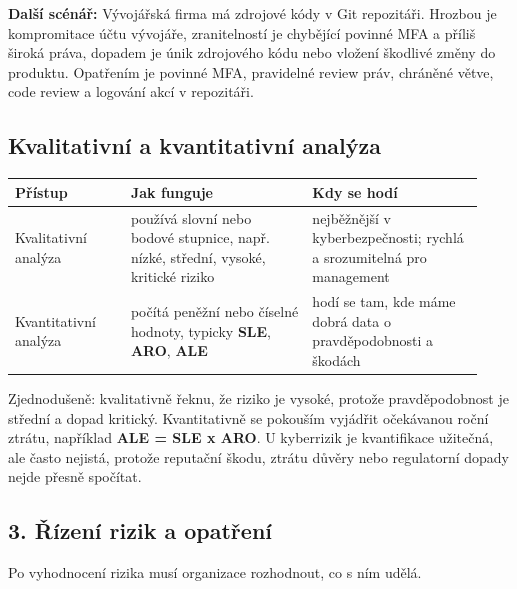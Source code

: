 \documentclass[11pt,a4paper]{article}
\newcommand{\itpr}[1]{\medskip\noindent\colorbox{green!8}{\parbox{\dimexpr\linewidth-2\fboxsep}{#1}}\medskip}
\begin{document}
\itpr{\textbf{Další scénář:} Vývojářská firma má zdrojové kódy v Git repozitáři. Hrozbou je kompromitace účtu vývojáře, zranitelností je chybějící povinné MFA a příliš široká práva, dopadem je únik zdrojového kódu nebo vložení škodlivé změny do produktu. Opatřením je povinné MFA, pravidelné review práv, chráněné větve, code review a logování akcí v repozitáři.}

\subsection*{Kvalitativní a kvantitativní analýza}

\begin{longtable}{p{0.23\linewidth}p{0.36\linewidth}p{0.34\linewidth}}
\toprule
\textbf{Přístup} & \textbf{Jak funguje} & \textbf{Kdy se hodí} \\
\midrule\endhead
Kvalitativní analýza & používá slovní nebo bodové stupnice, např. nízké, střední, vysoké, kritické riziko & nejběžnější v kyberbezpečnosti; rychlá a srozumitelná pro management \\
\addlinespace
Kvantitativní analýza & počítá peněžní nebo číselné hodnoty, typicky \textbf{SLE}, \textbf{ARO}, \textbf{ALE} & hodí se tam, kde máme dobrá data o pravděpodobnosti a škodách \\
\bottomrule
\end{longtable}

Zjednodušeně: kvalitativně řeknu, že riziko je vysoké, protože pravděpodobnost je střední a dopad kritický. Kvantitativně se pokouším vyjádřit očekávanou roční ztrátu, například \textbf{ALE = SLE x ARO}. U kyberrizik je kvantifikace užitečná, ale často nejistá, protože reputační škodu, ztrátu důvěry nebo regulatorní dopady nejde přesně spočítat.

\subsection*{3. Řízení rizik a opatření}

Po vyhodnocení rizika musí organizace rozhodnout, co s ním udělá.
\end{document}
